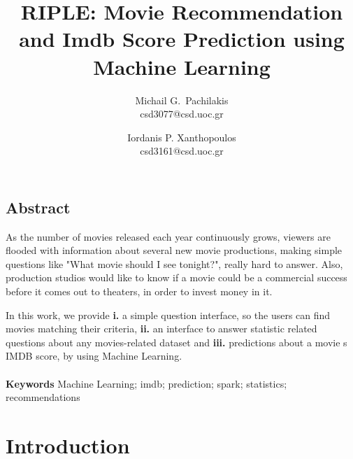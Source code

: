 \documentclass[letterpaper,twocolumn,10pt]{article}
\begin{document}
\date{}

\title{\Large \bf RIPLE: Movie Recommendation and Imdb Score Prediction using Machine Learning}

\author{
{\rm Michail G.\ Pachilakis}\\
csd3077@csd.uoc.gr
\and
{\rm Iordanis P. Xanthopoulos}\\
csd3161@csd.uoc.gr
} %

\maketitle

\thispagestyle{empty}


\subsection*{Abstract}
\par As the number of movies released each year continuously grows, viewers are flooded with information about several new movie productions, making simple questions like "What movie should I see tonight?", really hard to answer. Also, production studios would like to know if a movie could be a commercial success before it comes out to theaters, in order to invest money in it.\par In this work, we provide  \textbf{i.} a simple question interface, so the users can find movies matching their criteria, \textbf{ii.} an interface to answer statistic related questions about any movies-related dataset and \textbf{iii.} predictions about a movie\textsc{} s IMDB score, by using Machine Learning.\\
\\
\textbf{Keywords} Machine Learning; imdb; prediction; spark; statistics; recommendations


\section{Introduction}
\end{document}
